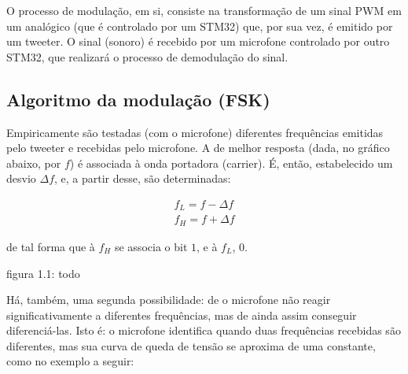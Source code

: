 \documentclass[11pt,a4paper]{report}
\begin{document}
	
	O processo de modulação, em si, consiste na transformação de um sinal PWM em um analógico (que é controlado por um STM32) que, por sua vez, é emitido por um tweeter. O sinal (sonoro) é recebido por um microfone controlado por outro STM32, que realizará o processo de demodulação do sinal.
	\subsection{Algoritmo da modulação (FSK)}	

	Empiricamente são testadas (com o microfone) diferentes frequências emitidas pelo tweeter e recebidas pelo microfone. A de melhor resposta (dada, no gráfico abaixo, por $f$) é associada à onda portadora (carrier). É, então, estabelecido um desvio $\Delta{f}$, e, a partir desse, são determinadas:
	\begin{center}
		\begin{align*}
		f_L = f - \Delta{f}\\
		f_H = f + \Delta{f}
		\end{align*}
	\end{center}
	de tal forma que à $f_H$ se associa o bit $1$, e à $f_L$, $0$.
	

	
	\begin{center}
	\end{center}
\begin{center}
	{\footnotesize figura 1.1: todo}
\end{center}

Há, também, uma segunda possibilidade: de o microfone não reagir significativamente a diferentes frequências, mas de ainda assim conseguir diferenciá-las. Isto é: o microfone identifica quando duas frequências recebidas são diferentes, mas sua curva de queda de tensão se aproxima de uma constante, como no exemplo a seguir:
\end{document}
